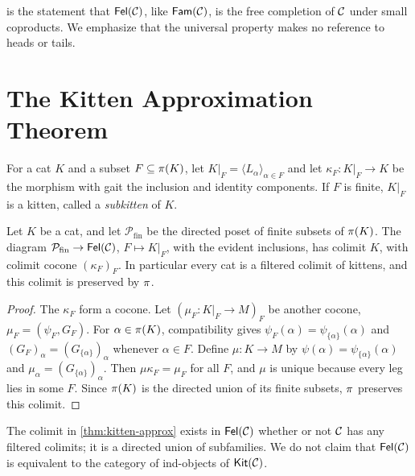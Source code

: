 \begin{remark}\label{rem:universal-honest}
 is the statement that $\mathsf{Fel}(\mathcal{C})$, like
$\mathsf{Fam}(\mathcal{C})$, is the free completion of $\mathcal{C}$ under small coproducts. We
emphasize that the universal property makes no reference to heads or tails.
\end{remark}

\section{The Kitten Approximation Theorem}\label{sec:kitten-approx}

For a cat $K$ and a subset $F\subseteq\pi(K)$, let
$K|_F=\langle L_\alpha\rangle_{\alpha\in F}$ and let $\kappa_F\colon K|_F\to K$
be the morphism with gait the inclusion and identity components. If $F$ is
finite, $K|_F$ is a kitten, called a \emph{subkitten} of $K$.

\begin{theorem}\label{thm:kitten-approx}
Let $K$ be a cat, and let $\mathcal P_{\mathrm{fin}}$ be the directed poset of
finite subsets of $\pi(K)$. The diagram $\mathcal P_{\mathrm{fin}}\to\mathsf{Fel}(\mathcal{C})$,
$F\mapsto K|_F$, with the evident inclusions, has colimit $K$, with colimit
cocone $(\kappa_F)_F$. In particular every cat is a filtered colimit of kittens,
and this colimit is preserved by $\pi$.
\end{theorem}

\begin{proof}
The $\kappa_F$ form a cocone. Let $(\mu_F\colon K|_F\to M)_F$ be another cocone,
$\mu_F=(\psi_F,G_F)$. For $\alpha\in\pi(K)$, compatibility gives
$\psi_F(\alpha)=\psi_{\{\alpha\}}(\alpha)$ and $(G_F)_\alpha=(G_{\{\alpha\}})_\alpha$
whenever $\alpha\in F$. Define $\mu\colon K\to M$ by
$\psi(\alpha)=\psi_{\{\alpha\}}(\alpha)$ and $\mu_\alpha=(G_{\{\alpha\}})_\alpha$. Then
$\mu\kappa_F=\mu_F$ for all $F$, and $\mu$ is unique because every leg lies in
some $F$. Since $\pi(K)$ is the directed union of its finite subsets, $\pi$
preserves this colimit.
\end{proof}

\begin{remark}\label{rem:kitten-approx-honest}
The colimit in \cref{thm:kitten-approx} exists in $\mathsf{Fel}(\mathcal{C})$ whether or not
$\mathcal{C}$ has any filtered colimits; it is a directed union of subfamilies. We do
not claim that $\mathsf{Fel}(\mathcal{C})$ is equivalent to the category of ind-objects of
$\mathsf{Kit}(\mathcal{C})$.
\end{remark}

